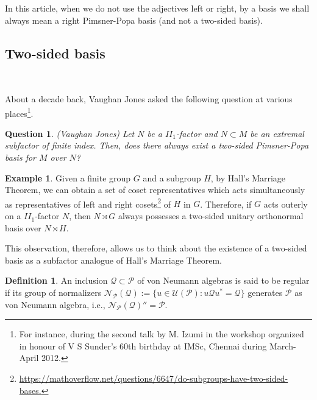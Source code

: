 \documentclass{amsart}
\newtheorem{question}[theorem]{Question}
\theoremstyle{definition}
\newtheorem{definition}[theorem]{Definition}
\newtheorem{example}[theorem]{Example}
\theoremstyle{theorem}
\begin{document}
In this article, when we do not use the adjectives left or
  right, by a basis we shall always mean a right Pimsner-Popa basis
  (and not a two-sided basis).


\subsection{Two-sided basis} \( \)

About a decade back, Vaughan Jones asked the following question at
various places\footnote{For instance, during the second talk by
M. Izumi in the workshop organized in honour of V S Sunder's 60th
birthday at IMSc, Chennai during March-April 2012.}.
\begin{question}(Vaughan Jones) \label{Jones}
 Let $N$ be a $II_1$-factor and $N\subset M$ be an extremal subfactor of
finite index. Then, does there always exist a two-sided Pimsner-Popa basis for
 $M$ over $N$?
\end{question}
      \begin{example}
  Given a finite group $G$ and a subgroup $H$, by Hall's Marriage
  Theorem, we can obtain a set of coset representatives which acts
  simultaneously as representatives of left and right
  cosets\footnote{
  \url{https://mathoverflow.net/questions/6647/do-subgroups-have-two-sided-bases.}}
  of $H$ in $G$. Therefore, if $G$ acts outerly on a $II_1$-factor
  $N$, then $N\rtimes G$ always possesses a two-sided unitary
  orthonormal basis over $N\rtimes H$.

  This observation, therefore, allows us to
  think about the existence of a two-sided basis as a subfactor
  analogue of Hall's Marriage Theorem.
        \end{example}

\begin{definition}    
An inclusion $\mathcal{Q} \subset \mathcal{P}$ of von Neumann algebras
is said to be regular if its group of normalizers
$\mathcal{N}_{\mathcal{P}}(\mathcal{Q}):=\{u\in
\mathcal{U}(\mathcal{P}):u\mathcal{Q}u^*=\mathcal{Q}\}$ generates
$\mathcal{P}$ as von Neumann algebra, i.e.,
$\mathcal{N}_{\mathcal{P}}(\mathcal{Q})'' = \mathcal{P}$.
\end{definition}
\end{document}
